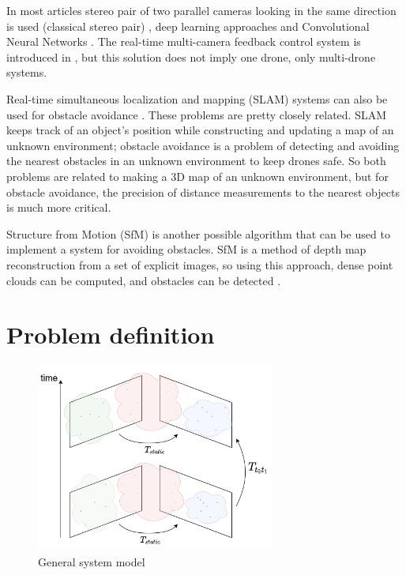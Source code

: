 In most articles stereo pair of two parallel cameras looking in the same direction is used (classical stereo pair) \cite{Yu2018, Lin2021, Xiao2019}, deep learning approaches \cite{Back2020, FragaLamas2019, Park2020, Roghair2021} and Convolutional Neural Networks \cite{Yu2013, Ma2020}. 
The real-time multi-camera feedback control system is introduced in \cite{He2021}, but this solution does not imply one drone, only multi-drone systems.

Real-time simultaneous localization and mapping (SLAM) systems can also be used for obstacle avoidance \cite{Moreno2014}. 
These problems are pretty closely related. 
SLAM keeps track of an object's position while constructing and updating a map of an unknown environment; obstacle avoidance is a problem of detecting and avoiding the nearest obstacles in an unknown environment to keep drones safe.
So both problems are related to making a 3D map of an unknown environment, but for obstacle avoidance, the precision of distance measurements to the nearest objects is much more critical.

Structure from Motion (SfM) is another possible algorithm that can be used to implement a system for avoiding obstacles. 
SfM is a method of depth map reconstruction from a set of explicit images, so using this approach, dense point clouds can be computed, and obstacles can be detected \cite{Lee2008}. 

\section{Problem definition}
\begin{figure}[h]
    \centering
    \includegraphics[width=0.7\textwidth]{graphics/general_scheme.png}
    \caption{General system model}
    \label{fig:general}
\end{figure}

